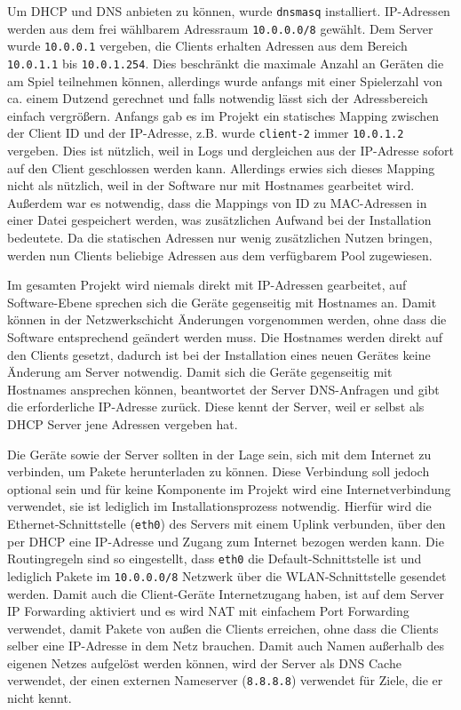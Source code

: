 Um DHCP und DNS anbieten zu können, wurde \texttt{dnsmasq} installiert. IP-Adressen
werden aus dem frei wählbarem Adressraum \texttt{10.0.0.0/8} gewählt. Dem Server wurde
\texttt{10.0.0.1} vergeben, die Clients erhalten Adressen aus dem Bereich \texttt{10.0.1.1} bis
\texttt{10.0.1.254}. Dies beschränkt die maximale Anzahl an Geräten die am Spiel
teilnehmen können, allerdings wurde anfangs mit einer Spielerzahl von ca.
einem Dutzend gerechnet und falls notwendig lässt sich der Adressbereich einfach
vergrößern. Anfangs gab es im Projekt ein statisches Mapping zwischen der
Client ID und der IP-Adresse, z.B. wurde \texttt{client-2} immer \texttt{10.0.1.2} vergeben.
Dies ist nützlich, weil in Logs und dergleichen aus der IP-Adresse sofort auf
den Client geschlossen werden kann. Allerdings erwies sich dieses Mapping nicht
als nützlich, weil in der Software nur mit Hostnames gearbeitet wird. Außerdem
war es notwendig, dass die Mappings von ID zu MAC-Adressen in einer Datei
gespeichert werden, was zusätzlichen Aufwand bei der Installation bedeutete.
Da die statischen Adressen nur wenig zusätzlichen Nutzen bringen, werden nun
Clients beliebige Adressen aus dem verfügbarem Pool zugewiesen.

Im gesamten Projekt wird niemals direkt mit IP-Adressen gearbeitet, auf
Software-Ebene sprechen sich die Geräte gegenseitig mit Hostnames an. Damit
können in der Netzwerkschicht Änderungen vorgenommen werden, ohne dass die
Software entsprechend geändert werden muss. Die Hostnames werden direkt auf
den Clients gesetzt, dadurch ist bei der Installation eines neuen Gerätes keine
Änderung am Server notwendig. Damit sich die Geräte gegenseitig mit Hostnames
ansprechen können, beantwortet der Server DNS-Anfragen und gibt die
erforderliche IP-Adresse zurück. Diese kennt der Server, weil er selbst als
DHCP Server jene Adressen vergeben hat.

Die Geräte sowie der Server sollten in der Lage sein, sich mit dem Internet
zu verbinden, um Pakete herunterladen zu können. Diese Verbindung soll jedoch
optional sein und für keine Komponente im Projekt wird eine Internetverbindung
verwendet, sie ist lediglich im Installationsprozess notwendig. Hierfür wird
die Ethernet-Schnittstelle (\texttt{eth0}) des Servers mit einem Uplink verbunden, über
den per DHCP eine IP-Adresse und Zugang zum Internet bezogen werden kann. Die
Routingregeln sind so eingestellt, dass \texttt{eth0} die Default-Schnittstelle ist und
lediglich Pakete im \texttt{10.0.0.0/8} Netzwerk über die WLAN-Schnittstelle gesendet
werden. Damit auch die Client-Geräte Internetzugang haben, ist auf dem Server
IP Forwarding aktiviert und es wird NAT mit einfachem Port Forwarding verwendet,
damit Pakete von außen die Clients erreichen, ohne dass die Clients selber eine
IP-Adresse in dem Netz brauchen. Damit auch Namen außerhalb des eigenen Netzes
aufgelöst werden können, wird der Server als DNS Cache verwendet, der einen externen
Nameserver (\texttt{8.8.8.8}) verwendet für Ziele, die er nicht kennt.
